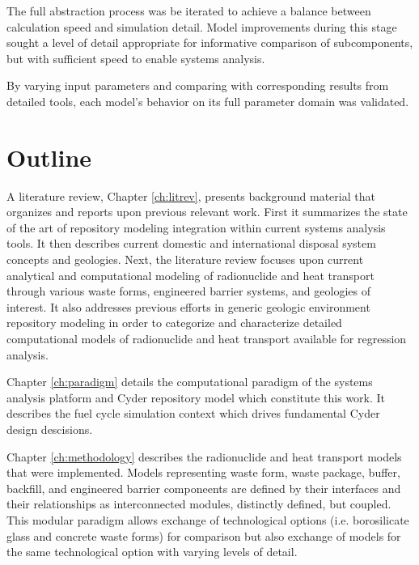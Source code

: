 
The full abstraction process was be iterated to achieve a balance between 
calculation speed and simulation detail. Model improvements during this stage 
sought a level of detail appropriate for informative comparison of subcomponents, but 
with sufficient speed to enable systems analysis. 


By varying input parameters and comparing with corresponding results from 
detailed tools, each model's behavior on its full parameter domain was 
validated.


\section{Outline}


A literature review, Chapter \ref{ch:litrev}, presents background material that organizes and 
reports upon previous relevant work. First it summarizes the state of the art of 
repository modeling integration within current systems analysis tools. It then 
describes current domestic and international disposal system concepts and
geologies.  Next, the literature review focuses upon current analytical and 
computational modeling of radionuclide and heat transport through various waste 
forms, engineered barrier systems, and geologies of interest.  It also 
addresses previous efforts in generic geologic environment repository modeling in order to 
categorize and characterize detailed computational models of radionuclide and 
heat transport available for regression analysis.


Chapter \ref{ch:paradigm} details the computational paradigm of the \Cyclus 
systems analysis platform and Cyder repository model which constitute this work. 
It describes the \Cyclus fuel cycle simulation context which drives fundamental 
Cyder design descisions. 


Chapter \ref{ch:methodology} describes the radionuclide and heat transport 
models that were implemented. Models representing waste form, waste package, 
buffer, backfill, and engineered barrier componeents are defined by their 
interfaces and their relationships as interconnected modules, distinctly 
defined, but coupled. This modular paradigm allows exchange  of technological 
options (i.e. borosilicate glass and concrete waste forms) for comparison but 
also exchange of models for the same technological option with varying levels 
of detail.  

